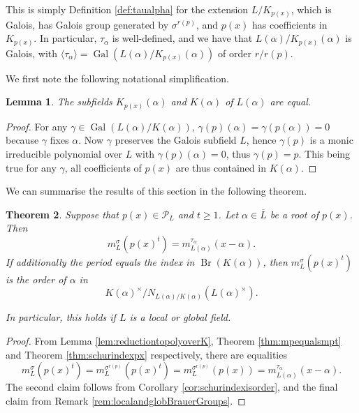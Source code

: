 \documentclass[10pt, reqno, hidelinks]{amsart}
\DeclareMathOperator{\Gal}{Gal}
\DeclareMathOperator{\Br}{Br}
\newcommand{\sP}{{\mathcal P}}
\newtheorem{thm}{Theorem}
\numberwithin{thm}{subsection}
\newtheorem{lemma}[thm]{Lemma}
\theoremstyle{definition}
\begin{document}
This is simply Definition \ref{def:taualpha} for the extension $L/K_{p(x)}$, which is Galois, has Galois group generated by $\sigma^{r(p)}$, and $p(x)$ has coefficients in $K_{p(x)}$. In particular, $\tau_{\alpha}$ is well-defined, and we have that $L(\alpha) / K_{p(x)}(\alpha)$ is Galois, with $\langle \tau_{\alpha} \rangle = \Gal(L(\alpha) / K_{p(x)}(\alpha))$ of order $r / r(p)$.

We first note the following notational simplification.

\begin{lemma}\label{lem:dontneedpx}
	The subfields $K_{p(x)}(\alpha)$ and $K(\alpha)$ of $L(\alpha)$ are equal.
\end{lemma}

\begin{proof}
	For any $\gamma \in \Gal(L(\alpha) / K(\alpha))$, $\gamma(p)(\alpha) = \gamma(p(\alpha)) = 0$ because $\gamma$ fixes $\alpha$. Now $\gamma$ preserves the Galois subfield $L$, hence $\gamma(p)$ is a monic irreducible polynomial over $L$ with $\gamma(p)(\alpha) = 0$, thus $\gamma(p) = p$. This being true for any $\gamma$, all coefficients of $p(x)$ are thus contained in $K(\alpha)$.
\end{proof}

We can summarise the results of this section in the following theorem.

\begin{thm}\label{thm:mainthm}
	Suppose that $p(x) \in \sP_L$ and $t \geq 1$. Let $\alpha \in \overline{L}$ be a root of $p(x)$. Then 
	\[
	m_L^{\sigma}(p(x)^t) = m_{L(\alpha)}^{\tau_{\alpha}}(x - \alpha).
	\]
	If additionally the period equals the index in $\Br(K(\alpha))$, then $m_L^{\sigma}(p(x)^t)$ is the order of $\alpha$ in
	\[
		K(\alpha)^{\times} / N_{L(\alpha) / K(\alpha)}(L(\alpha)^{\times}).
	\]

	In particular, this holds if $L$ is a local or global field.
\end{thm}

\begin{proof}
From Lemma \ref{lem:reductiontopolyoverK}, Theorem \ref{thm:mpequalsmpt} and Theorem \ref{thm:schurindexpx} respectively, there are equalities
\[
m_L^{\sigma}(p(x)^t) = m_L^{\sigma^{r(p)}}(p(x)^t) = m_L^{\sigma^{r(p)}}(p(x)) = m_{L(\alpha)}^{\tau_{\alpha}}(x - \alpha).
\]
The second claim follows from Corollary \ref{cor:schurindexisorder}, and the final claim from Remark \ref{rem:localandglobBrauerGroups}.
\end{proof}
\end{document}
